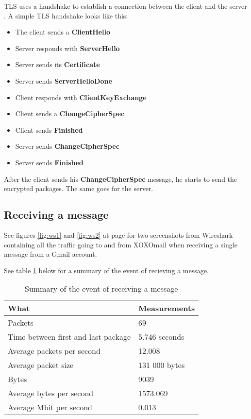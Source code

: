 \newpage

TLS uses a handshake to establish a connection between the client and the server \cite{bib:tls}.
A simple TLS handshake looks like this:
\begin{itemize}
\item{}The client sends a \textbf{ClientHello}
\item{}Server responds with \textbf{ServerHello}
\item{}Server sends its \textbf{Certificate}
\item{}Server sends \textbf{ServerHelloDone}
\item{}Client responds with \textbf{ClientKeyExchange}
\item{}Client sends a \textbf{ChangeCipherSpec}
\item{}Client sends \textbf{Finished}
\item{}Server sends \textbf{ChangeCipherSpec}
\item{}Server sends \textbf{Finished}
\end{itemize}

After the client sends his \textbf{ChangeCipherSpec} message, he starts to send the encrypted packages. The same goes for the server. 

\subsection{Receiving a message}

See figures \ref{fig:ws1} and \ref{fig:ws2} at page \pageref{fig:ws1} for two screenshots from Wireshark containing all the traffic going to and from XOXOmail when receiving a single message from a Gmail account.

See table \ref{tab:summaryrecmes} below for a summary of the event of recieving a message.
\begin{table}[h!]
\begin{center}
\begin{tabular}{l|l} \hline
\textbf{What} & \textbf{Measurements} \\ \hline \hline
Packets & 69 \\
Time between first and last package & 5.746 seconds \\
Average packets per second & 12.008 \\
Average packet size & 131 000 bytes \\
Bytes & 9039 \\
Average bytes per second & 1573.069 \\
Average Mbit per second & 0.013 \\ \hline
\end{tabular}
\end{center}
\caption{Summary of the event of receiving a message} \label{tab:summaryrecmes}
\end{table}

